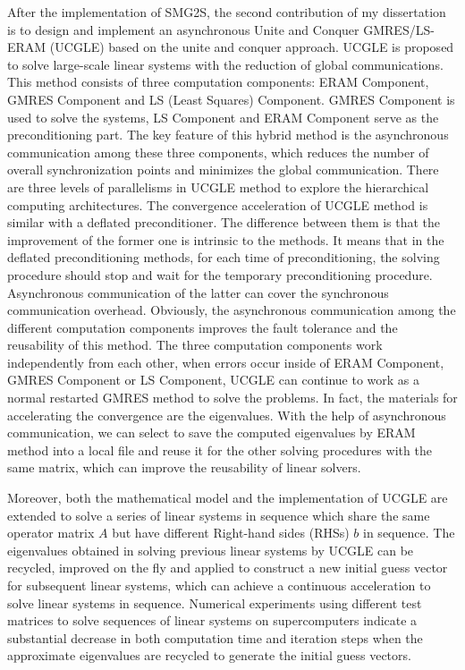 After the implementation of SMG2S, the second contribution of my dissertation is to design and implement an asynchronous Unite and Conquer GMRES/LS-ERAM (UCGLE) based on the unite and conquer approach. UCGLE is proposed to solve large-scale linear systems with the reduction of global communications. This method consists of three computation components: ERAM Component, GMRES Component and LS (Least Squares) Component. GMRES Component is used to solve the systems, LS Component and ERAM Component serve as the preconditioning part. The key feature of this hybrid method is the asynchronous communication among these three components, which reduces the number of overall synchronization points and minimizes the global communication. There are three levels of parallelisms in UCGLE method to explore the hierarchical computing architectures. The convergence acceleration of UCGLE method is similar with a deflated preconditioner. The difference between them is that the improvement of the former one is intrinsic to the methods. It means that in the deflated preconditioning methods, for each time of preconditioning, the solving procedure should stop and wait for the temporary preconditioning procedure. Asynchronous communication of the latter can cover the synchronous communication overhead. Obviously, the asynchronous communication among the different computation components improves the fault tolerance and the reusability of this method. The three computation components work independently from each other, when errors occur inside of ERAM Component, GMRES Component or LS Component, UCGLE can continue to work as a normal restarted GMRES method to solve the problems. In fact, the materials for accelerating the convergence are the eigenvalues. With the help of asynchronous communication, we can select to save the computed eigenvalues by ERAM method into a local file and reuse it for the other solving procedures with the same matrix, which can improve the reusability of linear solvers.

Moreover, both the mathematical model and the implementation of UCGLE are extended to solve a series of linear systems in sequence which share the same operator matrix $A$ but have different Right-hand sides (RHSs) $b$ in sequence. The eigenvalues obtained in solving previous linear systems by UCGLE can be recycled, improved on the fly and applied to construct a new initial guess vector for subsequent linear systems, which can achieve a continuous acceleration to solve linear systems in sequence. Numerical experiments using different test matrices to solve sequences of linear systems on supercomputers indicate a substantial decrease in both computation time and iteration steps when the approximate eigenvalues are recycled to generate the initial guess vectors.

